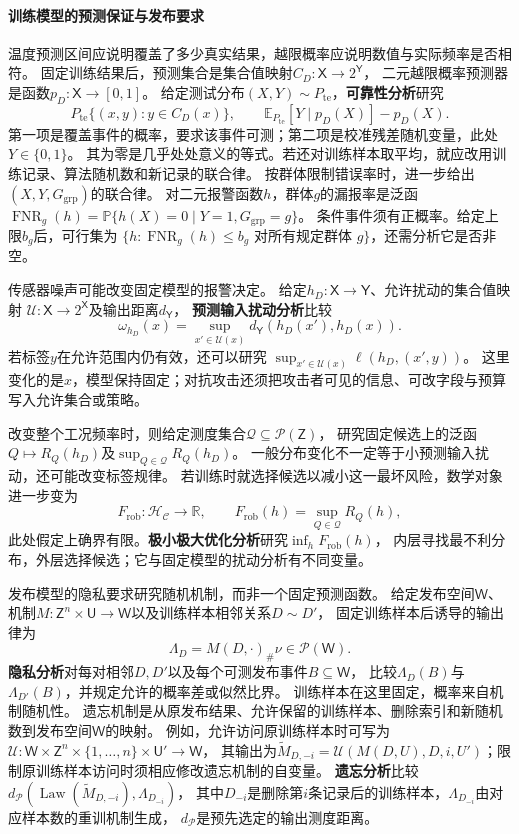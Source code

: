 \paragraph{训练模型的预测保证与发布要求}
\label{sec:future-ml-deployment-requirements}

温度预测区间应说明覆盖了多少真实结果，越限概率应说明数值与实际频率是否相符。
固定训练结果后，预测集合是集合值映射$C_D:\mathsf X\to2^{\mathsf Y}$，
二元越限概率预测器是函数$p_D:\mathsf X\to[0,1]$。
给定测试分布$(X,Y)\sim P_{\mathrm{te}}$，\textbf{可靠性分析}研究
\[
  P_{\mathrm{te}}\{(x,y):y\in C_D(x)\},\qquad
  \mathbb E_{P_{\mathrm{te}}}[Y\mid p_D(X)]-p_D(X).
\]
第一项是覆盖事件的概率，要求该事件可测；第二项是校准残差随机变量，此处$Y\in\{0,1\}$。
其为零是几乎处处意义的等式。若还对训练样本取平均，就应改用训练记录、算法随机数和新记录的联合律。
按群体限制错误率时，进一步给出$(X,Y,G_{\mathrm{grp}})$的联合律。
对二元报警函数$h$，群体$g$的漏报率是泛函
$\operatorname{FNR}_g(h)=\mathbb P\{h(X)=0\mid Y=1,G_{\mathrm{grp}}=g\}$。
条件事件须有正概率。给定上限$b_g$后，可行集为
$\{h:\operatorname{FNR}_g(h)\leq b_g\text{ 对所有规定群体 }g\}$，还需分析它是否非空。

传感器噪声可能改变固定模型的报警决定。
给定$h_D:\mathsf X\to\mathsf Y$、允许扰动的集合值映射
$\mathcal U:\mathsf X\to2^{\mathsf X}$及输出距离$d_{\mathsf Y}$，
\textbf{预测输入扰动分析}比较
\[
  \omega_{h_D}(x)=\sup_{x'\in\mathcal U(x)}
                  d_{\mathsf Y}(h_D(x'),h_D(x)).
\]
若标签$y$在允许范围内仍有效，还可以研究
$\sup_{x'\in\mathcal U(x)}\ell(h_D,(x',y))$。
这里变化的是$x$，模型保持固定；对抗攻击还须把攻击者可见的信息、可改字段与预算写入允许集合或策略。

改变整个工况频率时，则给定测度集合$\mathcal Q\subseteq\mathcal P(\mathsf Z)$，
研究固定候选上的泛函$Q\mapsto R_Q(h_D)$及$\sup_{Q\in\mathcal Q}R_Q(h_D)$。
一般分布变化不一定等于小预测输入扰动，还可能改变标签规律。
若训练时就选择候选以减小这一最坏风险，数学对象进一步变为
\[
  F_{\mathrm{rob}}:\mathcal H_{\mathcal C}\to\mathbb R,
  \qquad F_{\mathrm{rob}}(h)=\sup_{Q\in\mathcal Q}R_Q(h),
\]
此处假定上确界有限。\textbf{极小极大优化分析}研究$\inf_hF_{\mathrm{rob}}(h)$，
内层寻找最不利分布，外层选择候选；它与固定模型的扰动分析有不同变量。

发布模型的隐私要求研究随机机制，而非一个固定预测函数。
给定发布空间$\mathsf W$、机制$M:\mathsf Z^n\times\mathsf U\to\mathsf W$以及训练样本相邻关系$D\sim D'$，
固定训练样本后诱导的输出律为
\[
  \Lambda_D=M(D,\cdot)_{\#}\nu\in\mathcal P(\mathsf W).
\]
\textbf{隐私分析}对每对相邻$D,D'$以及每个可测发布事件$B\subseteq\mathsf W$，
比较$\Lambda_D(B)$与$\Lambda_{D'}(B)$，并规定允许的概率差或似然比界。
训练样本在这里固定，概率来自机制随机性。
遗忘机制是从原发布结果、允许保留的训练样本、删除索引和新随机数到发布空间$\mathsf W$的映射。
例如，允许访问原训练样本时可写为
$\mathscr U:\mathsf W\times\mathsf Z^n\times\{1,\ldots,n\}\times\mathsf U'\to\mathsf W$，
其输出为$\widetilde M_{D,-i}=\mathscr U(M(D,U),D,i,U')$；限制原训练样本访问时须相应修改遗忘机制的自变量。
\textbf{遗忘分析}比较
$d_{\mathcal P}(\operatorname{Law}(\widetilde M_{D,-i}),\Lambda_{D_{-i}})$，
其中$D_{-i}$是删除第$i$条记录后的训练样本，$\Lambda_{D_{-i}}$由对应样本数的重训机制生成，
$d_{\mathcal P}$是预先选定的输出测度距离。

